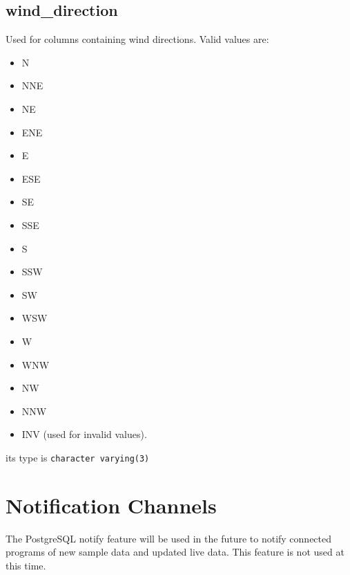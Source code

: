 \documentclass[a4paper,10pt]{book}
\newcommand{\partnumber}{\ifthenelse{\isundefined{\projectnum}}{}{\projectnum-\docnum	\ifthenelse{\equal{\docrev}{001}}{}{.\docrev}}}
\begin{document}
\section{wind\_direction}
\label{wind_direction}

Used for columns containing wind directions. Valid values are:
\begin{itemize}
\item N
\item NNE
\item NE
\item ENE
\item E
\item ESE
\item SE
\item SSE
\item S
\item SSW
\item SW
\item WSW
\item W
\item WNW
\item NW
\item NNW
\item INV (used for invalid values).
\end{itemize}

its type is \verb|character varying(3)|


\chapter{Notification Channels}
\label{cha_notify}

The PostgreSQL notify feature will be used in the future to notify connected programs of new sample data and updated live data. This feature is not used at this time.



\newpage
\thispagestyle{empty}
\begin{flushright}
\null
\vfill
\tt \partnumber
\end{flushright}
\end{document}
